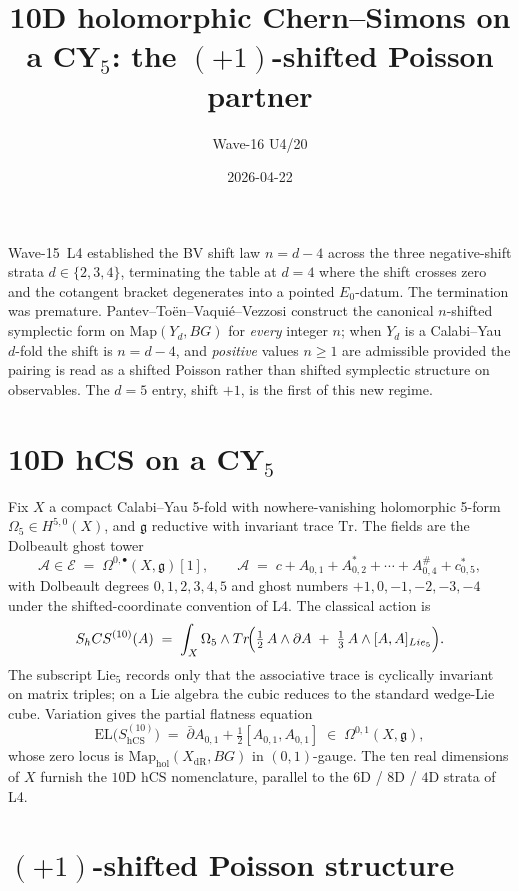 \documentclass[11pt]{amsart}
\title{10D holomorphic Chern--Simons on a CY$_5$: the $(+1)$-shifted
Poisson partner}
\author{Wave-16 U4/20}
\date{2026-04-22}
\providecommand{\cA}{\mathcal{A}}
\providecommand{\cE}{\mathcal{E}}
\providecommand{\dbar}{\bar{\partial}}
\providecommand{\g}{\mathfrak{g}}
\providecommand{\tr}{\mathrm{Tr}}
\providecommand{\hCS}{\mathrm{hCS}}
\providecommand{\Map}{\mathrm{Map}}
\theoremstyle{plain}
\theoremstyle{definition}
\begin{document}
\maketitle

Wave-15~L4 established the BV shift law $n = d-4$ across the three
negative-shift strata $d \in \{2,3,4\}$, terminating the table at
$d=4$ where the shift crosses zero and the cotangent bracket
degenerates into a pointed $E_0$-datum. The termination was premature.
Pantev--To\"en--Vaqui\'e--Vezzosi \cite{PTVV2013} construct the
canonical $n$-shifted symplectic form on $\Map(Y_d, BG)$ for
\emph{every} integer $n$; when $Y_d$ is a Calabi--Yau $d$-fold the
shift is $n = d-4$, and \emph{positive} values $n \geq 1$ are
admissible provided the pairing is read as a shifted Poisson rather
than shifted symplectic structure on observables. The $d=5$ entry,
shift $+1$, is the first of this new regime.

\section{10D hCS on a CY$_5$}

Fix $X$ a compact Calabi--Yau 5-fold with nowhere-vanishing
holomorphic 5-form $\Omega_5 \in H^{5,0}(X)$, and $\g$ reductive with
invariant trace $\tr$. The fields are the Dolbeault ghost tower
\[
\cA \in \cE \;=\; \Omega^{0,\bullet}(X,\g)[1],\qquad
\cA \;=\; c + A_{0,1} + A^*_{0,2} + \cdots + A^{\#}_{0,4} + c^*_{0,5},
\]
with Dolbeault degrees $0, 1, 2, 3, 4, 5$ and ghost numbers
$+1, 0, -1, -2, -3, -4$ under the shifted-coordinate convention of
L4. The classical action is
\[
S_\hCS^{(10)}(\cA) \;=\; \int_X \Omega_5 \wedge \tr\!\Bigl(
 \tfrac12\, \cA \wedge \dbar\cA \;+\; \tfrac13\, \cA \wedge
 [\cA, \cA]_{\mathrm{Lie}_5} \Bigr).
\]
The subscript $\mathrm{Lie}_5$ records only that the associative
trace is cyclically invariant on matrix triples; on a Lie algebra the
cubic reduces to the standard wedge-Lie cube. Variation gives the
partial flatness equation
\[
\mathrm{EL}\bigl(S_\hCS^{(10)}\bigr) \;=\; \dbar A_{0,1} +
\tfrac12 [A_{0,1}, A_{0,1}] \;\in\; \Omega^{0,1}(X, \g),
\]
whose zero locus is $\Map_{\mathrm{hol}}(X_{\mathrm{dR}}, BG)$ in
$(0,1)$-gauge. The ten real dimensions of $X$ furnish the
$10$D $\hCS$ nomenclature, parallel to the $6$D / $8$D / $4$D strata
of L4.

\section{$(+1)$-shifted Poisson structure}
\end{document}
